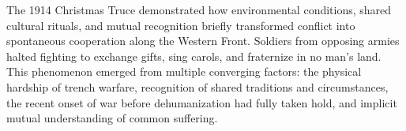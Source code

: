 The 1914 Christmas Truce demonstrated how environmental conditions, shared cultural rituals, and mutual recognition briefly transformed conflict into spontaneous cooperation along the Western Front. Soldiers from opposing armies halted fighting to exchange gifts, sing carols, and fraternize in no man's land. This phenomenon emerged from multiple converging factors: the physical hardship of trench warfare, recognition of shared traditions and circumstances, the recent onset of war before dehumanization had fully taken hold, and implicit mutual understanding of common suffering.
